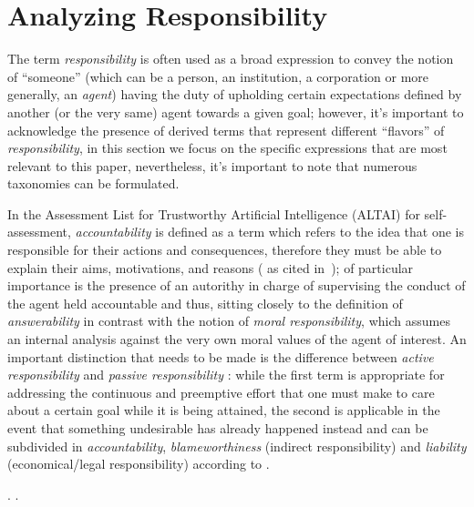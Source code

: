 \section{Analyzing Responsibility}\label{sec:responsibility}

The term \textit{responsibility} is often used as a broad expression to convey the notion of ``someone'' (which can be a person, an institution, a corporation or more generally, an \textit{agent}) having the duty of upholding certain expectations defined by another (or the very same) agent towards a given goal; however, it's important to acknowledge the presence of derived terms that represent different ``flavors'' of \textit{responsibility}, in this section we focus on the specific expressions that are most relevant to this paper, nevertheless, it's important to note that numerous taxonomies can be formulated.

In the Assessment List for Trustworthy Artificial Intelligence (ALTAI) for self-assessment, \textit{accountability} is defined as a term which refers to the idea that one is responsible for their actions and consequences, therefore they must be able to explain their aims, motivations, and reasons (\cite{ALTAI} as cited in~\cite{NOVAIA});  of particular importance is the presence of an autorithy in charge of supervising the conduct of the agent held accountable and thus, sitting closely to the definition of \textit{answerability} \parencite{NISAIA} in contrast with the notion of \textit{moral responsibility}, which assumes an internal analysis against the very own moral values of the agent of interest.
An important distinction that needs to be made is the difference between \textit{active responsibility} and \textit{passive responsibility} \parencite{ETE}: while the first term is appropriate for addressing the continuous and preemptive effort that one must make to care about a certain goal while it is being attained, the second is applicable in the event that something undesirable has already happened instead and can be subdivided in \textit{accountability}, \textit{blameworthiness} (indirect responsibility) and \textit{liability} (economical/legal responsibility) according to \parencite{ETE}.

.
.
